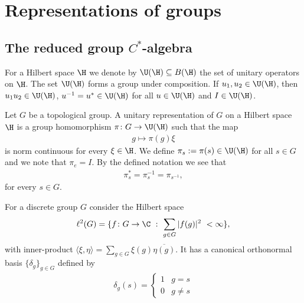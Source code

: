 \chapter{Representations of groups}

\section{The reduced group $C^*$-algebra}
For a Hilbert space $\H$ we denote by $\U(\H)\subseteq B(\H)$ the set of unitary operators on $\H$. The set $\U(\H)$ forms a group under composition. If $u_{1},u_{2} \in \U(\H)$, then $u_{1}u_{2} \in \U(\H)$, $u^{-1}=u^* \in \U(\H)$ for all $u \in \U(\H)$ and $I\in \U(\H)$. 

\begin{definition}
Let $G$ be a topological group. A unitary representation of $G$ on a Hilbert space $\H$ is a group homomorphism $\pi \colon G \to \U(\H)$ such that the map
\begin{align*}
g \mapsto \pi(g) \xi
\end{align*} 
is norm continuous for every $\xi \in \H$. We define $\pi_{s}:=\pi(s) \in \U(\H)$ for all $s \in G$ and we note that $\pi_{e}=I$. By the defined notation we see that
\begin{align*}
\pi_s^*=\pi_s^{-1}=\pi_{s^{-1}},
\end{align*} 
for every $s \in G$.
\end{definition}

\noindent For a discrete group $G$ consider the Hilbert space 
\begin{align*}
\ell^2(G)= \{ f \colon G \to \C \ : \ \sum_{g \in G} |f(g)|^2\ < \infty\},
\end{align*}
with inner-product  $ \langle \xi , \eta \rangle = \sum_{g \in G} \xi(g) \overline{\eta(g)}$. It has a canonical orthonormal basis $\{ \delta_{g}\}_{g \in G}$ defined by
\begin{align*}
\delta_{g}(s)=\begin{cases}
1 & g=s\\
0 & g \neq s
\end{cases}
\end{align*}

